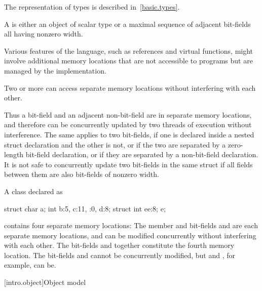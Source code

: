 \pnum
\begin{note}
The representation of types is described
in~\ref{basic.types}.
\end{note}

\pnum
A  is either an object of scalar type or a maximal
sequence of adjacent bit-fields all having nonzero width.
\begin{note}
Various
features of the language, such as references and virtual functions, might
involve additional memory locations that are not accessible to programs but are
managed by the implementation.
\end{note}
Two or more  can access separate memory
locations without interfering with each other.

\pnum
\begin{note}
Thus a bit-field and an adjacent non-bit-field are in separate memory
locations, and therefore can be concurrently updated by two threads of execution
without interference. The same applies to two bit-fields, if one is declared
inside a nested struct declaration and the other is not, or if the two are
separated by a zero-length bit-field declaration, or if they are separated by a
non-bit-field declaration. It is not safe to concurrently update two bit-fields
in the same struct if all fields between them are also bit-fields of nonzero
width.
\end{note}

\pnum
\begin{example}
A class declared as
\begin{codeblock}
struct {
  char a;
  int b:5,
  c:11,
  :0,
  d:8;
  struct {int ee:8;} e;
}
\end{codeblock}
contains four separate memory locations: The member  and bit-fields
 and  are each separate memory locations, and can be
modified concurrently without interfering with each other. The bit-fields
 and  together constitute the fourth memory location. The
bit-fields  and  cannot be concurrently modified, but
 and , for example, can be.
\end{example}

[intro.object]{Object model}

